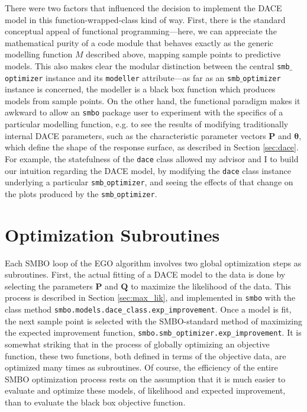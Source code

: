 There were two factors that influenced the decision to implement the DACE model in this function-wrapped-class kind of way. First, there is the standard conceptual appeal of functional programming---here, we can appreciate the mathematical purity of a code module that behaves exactly as the generic modelling function $M$ described above, mapping sample points to predictive models. This also makes clear the modular distinction between the central \texttt{smb$\_$optimizer} instance and its \texttt{modeller} attribute---as far as an \texttt{smb$\_$optimizer} instance is concerned, the modeller is a black box function which produces models from sample points. On the other hand, the functional paradigm makes it awkward to allow an \texttt{smbo} package user to experiment with the specifics of a particular modelling function, e.g. to see the results of modifying traditionally internal DACE parameters, such as the characteristic parameter vectors $\mathbf{P}$ and $\mathbf{\theta}$, which define the shape of the response surface, as described in Section \ref{sec:dace}. For example, the statefulness of the \texttt{dace} class allowed my advisor and I to build our intuition regarding the DACE model, by modifying the \texttt{dace} class instance underlying a particular \texttt{smb$\_$optimizer}, and seeing the effects of that change on the plots produced by the \texttt{smb$\_$optimizer}.






\section{Optimization Subroutines}
Each SMBO loop of the EGO algorithm involves two global optimization steps as subroutines. First, the actual fitting of a DACE model to the data is done by selecting the parameters $\mathbf{P}$ and $\mathbf{Q}$ to maximize the likelihood of the data. This process is described in Section \ref{sec:max_lik}, and implemented in \texttt{smbo} with the class method \texttt{smbo.models.dace\_class.exp\_improvement}. Once a model is fit, the next sample point is selected with the SMBO-standard method of maximizing the expected improvement function, \texttt{smbo.smb\_optimizer.exp\_improvement}. It is somewhat striking that in the process of globally optimizing an objective function, these two functions, both defined in terms of the objective data, are optimized many times as subroutines. Of course, the efficiency of the entire SMBO optimization process rests on the assumption that it is much easier to evaluate and optimize these models, of likelihood and expected improvement, than to evaluate the black box objective function. 

